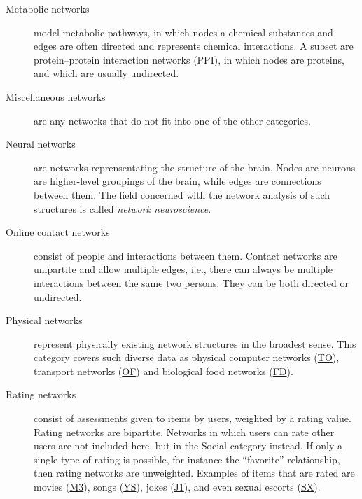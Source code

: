 \documentclass{article}
\begin{document}
\begin{description}
\item[Metabolic networks] model metabolic pathways,
   in which nodes a chemical substances
  and edges are often directed and represents chemical interactions.  A
  subset are protein--protein interaction networks (PPI), in which nodes
  are proteins, and which are usually undirected.

\item[Miscellaneous networks] are any networks that do not fit into one
  of the other categories. 

\item[Neural networks] are networks reprensentating the structure of the
  brain.  Nodes are neurons are higher-level groupings of the brain,
  while edges are connections between them.  The field concerned with
  the network analysis of such structures is called \emph{network neuroscience}. 
  
\item[Online contact networks] consist of people and interactions between
   them.  Contact networks are
  unipartite and allow multiple edges, i.e., there can always be
  multiple interactions between the same two persons.  They can be both
  directed or undirected.

\item[Physical networks] represent physically existing network
   structures in the broadest sense.  This
  category covers such diverse data as physical computer networks
  (\href{http://konect.cc/networks/topology/}{\textsf{TO}}), transport
  networks
  (\href{http://konect.cc/networks/opsahl-openflights/}{\textsf{OF}}) and
  biological food networks
  (\href{http://konect.cc/networks/foodweb-baydry/}{\textsf{FD}}).

\item[Rating networks] consist of assessments given to items by users,
   weighted by a rating value.  Rating
  networks are bipartite.  Networks in which users can rate other users
  are not included here, but in the Social category instead.  If only a
  single type of rating is possible, for instance the ``favorite''
  relationship, then rating networks are unweighted.  Examples of items
  that are rated are movies
  (\href{http://konect.cc/networks/movielens-10m_rating/}{\textsf{M3}}),
  songs (\href{http://konect.cc/networks/yahoo-song/}{\textsf{YS}}),
  jokes (\href{http://konect.cc/networks/jester1/}{\textsf{J1}}), and even
  sexual escorts
  (\href{http://konect.cc/networks/escorts/}{\textsf{SX}}).


\end{description}
\end{document}
